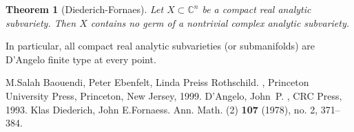 \documentclass[12pt]{article}
\theoremstyle{theorem}
\newtheorem*{thm}{Theorem}
\theoremstyle{definition}
\theoremstyle{remark}
\begin{document}
\begin{thm}[Diederich-Fornaes]
Let $X \subset {\mathbb{C}}^n$ be a compact real analytic subvariety.  Then $X$ contains
no germ of a nontrivial complex analytic subvariety.
\end{thm}

In particular, all compact real analytic subvarieties (or submanifolds) are D'Angelo finite type at every point.

\begin{thebibliography}{9}
M.\@ Salah Baouendi,
Peter Ebenfelt,
Linda Preiss Rothschild.
{\em {}},
Princeton University Press,
Princeton, New Jersey, 1999.
D'Angelo, John~P.
{\em {}},
CRC Press, 1993.
Klas Diederich,
John E.\@ Fornaess.
{\em {}}
Ann. Math. (2) {\bf 107} (1978), no. 2, 371--384. 
\end{thebibliography}
\end{document}
